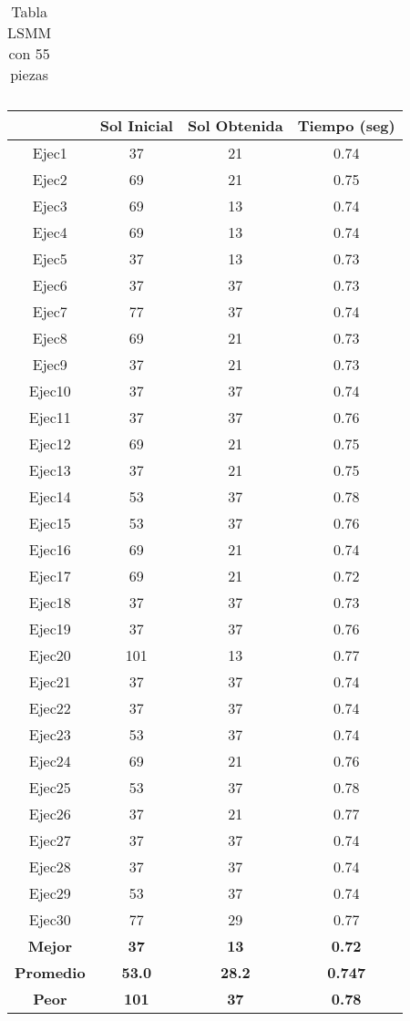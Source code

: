 \begin{center}
\begin{table}
\begin{tabular}{|c|c|c|c|}
\end{tabular}
\caption{Tabla LSMM con 55 piezas}
\end{table}

\begin{table}

\begin{tabular}{|c|c|c|c|}

\hline
 & {\bf Sol Inicial} & {\bf Sol Obtenida} & {\bf Tiempo (seg)} \\
\hline
Ejec1 & 37 & 21  & 0.74 \\
\hline
Ejec2 & 69 & 21  & 0.75 \\
\hline
Ejec3 & 69 & 13  & 0.74 \\
\hline
Ejec4 & 69 & 13  & 0.74 \\
\hline
Ejec5 & 37 & 13  & 0.73 \\
\hline
Ejec6 & 37 & 37  & 0.73 \\
\hline
Ejec7 & 77 & 37  & 0.74 \\
\hline
Ejec8 & 69 & 21  & 0.73 \\
\hline
Ejec9 & 37 & 21  & 0.73 \\
\hline
Ejec10 & 37 & 37  & 0.74 \\
\hline
Ejec11 & 37 & 37  & 0.76 \\
\hline
Ejec12 & 69 & 21  & 0.75 \\
\hline
Ejec13 & 37 & 21  & 0.75 \\
\hline
Ejec14 & 53 & 37  & 0.78 \\
\hline
Ejec15 & 53 & 37  & 0.76 \\
\hline
Ejec16 & 69 & 21  & 0.74 \\
\hline
Ejec17 & 69 & 21  & 0.72 \\
\hline
Ejec18 & 37 & 37  & 0.73 \\
\hline
Ejec19 & 37 & 37  & 0.76 \\
\hline
Ejec20 & 101 & 13  & 0.77 \\
\hline
Ejec21 & 37 & 37  & 0.74 \\
\hline
Ejec22 & 37 & 37  & 0.74 \\
\hline
Ejec23 & 53 & 37  & 0.74 \\
\hline
Ejec24 & 69 & 21  & 0.76 \\
\hline
Ejec25 & 53 & 37  & 0.78 \\
\hline
Ejec26 & 37 & 21  & 0.77 \\
\hline
Ejec27 & 37 & 37  & 0.74 \\
\hline
Ejec28 & 37 & 37  & 0.74 \\
\hline
Ejec29 & 53 & 37  & 0.74 \\
\hline
Ejec30 & 77 & 29  & 0.77 \\
\hline
{\bf Mejor} & {\bf 37} & {\bf 13} & {\bf 0.72} \\
\hline
{\bf Promedio} & {\bf 53.0} & {\bf 28.2} & {\bf 0.747} \\
\hline
{\bf Peor} & {\bf 101} & {\bf 37} & {\bf 0.78} \\
\hline


\end{tabular}
\end{table}
\end{center}
